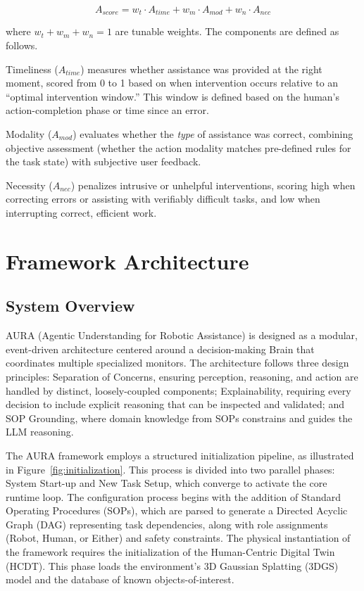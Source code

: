 \documentclass[sensors,article,submit,pdftex,moreauthors]{Definitions/mdpi}
\begin{document}
\begin{equation}
    A_{score} = w_t \cdot A_{time} + w_m \cdot A_{mod} + w_n \cdot A_{nec}
\end{equation}

where $w_t + w_m + w_n = 1$ are tunable weights. The components are defined as follows.

Timeliness ($A_{time}$) measures whether assistance was provided at the right moment, scored from 0 to 1 based on when intervention occurs relative to an ``optimal intervention window.'' This window is defined based on the human's action-completion phase or time since an error.

Modality ($A_{mod}$) evaluates whether the \textit{type} of assistance was correct, combining objective assessment (whether the action modality matches pre-defined rules for the task state) with subjective user feedback.

Necessity ($A_{nec}$) penalizes intrusive or unhelpful interventions, scoring high when correcting errors or assisting with verifiably difficult tasks, and low when interrupting correct, efficient work.

\section{Framework Architecture}

\subsection{System Overview}

AURA (Agentic Understanding for Robotic Assistance) is designed as a modular, event-driven architecture centered around a decision-making Brain that coordinates multiple specialized monitors. The architecture follows three design principles: Separation of Concerns, ensuring perception, reasoning, and action are handled by distinct, loosely-coupled components; Explainability, requiring every decision to include explicit reasoning that can be inspected and validated; and SOP Grounding, where domain knowledge from SOPs constrains and guides the LLM reasoning.

The AURA framework employs a structured initialization pipeline, as illustrated in Figure~\ref{fig:initialization}. This process is divided into two parallel phases: System Start-up and New Task Setup, which converge to activate the core runtime loop. The configuration process begins with the addition of Standard Operating Procedures (SOPs), which are parsed to generate a Directed Acyclic Graph (DAG) representing task dependencies, along with role assignments (Robot, Human, or Either) and safety constraints. The physical instantiation of the framework requires the initialization of the Human-Centric Digital Twin (HCDT). This phase loads the environment's 3D Gaussian Splatting (3DGS) model and the database of known objects-of-interest.
\end{document}
